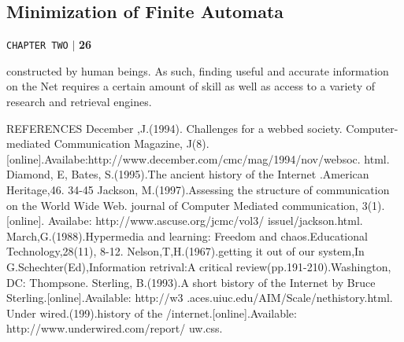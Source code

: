 \documentclass[a4,9pt]{beamer}
\begin{document}
\begin{frame}
\section*{Minimization of Finite Automata}
\begin{flushright}
 \texttt{CHAPTER TWO} \hspace*{0.1cm}\textbf{$|$} \hspace*{0.1cm} \textbf{26}\hspace*{0.1cm}
\end{flushright}
\vspace*{1cm}
constructed by human beings. As such, finding useful and accurate information on the
Net requires a certain amount of skill as well as access to a variety of research and
retrieval engines.

REFERENCES
December ,J.(1994). Challenges for a webbed society. Computer-mediated Communication Magazine,
J(8).[online].Availabe:http://www.december.com/cmc/mag/1994/nov/websoc. html.
Diamond, E, Bates, S.(1995).The ancient history of the Internet .American Heritage,46. 34-45
Jackson, M.(1997).Assessing the structure of communication on the World Wide Web. journal of
Computer Mediated communication, 3(1).[online]. Availabe: http://www.ascuse.org/jcmc/vol3/
issuel/jackson.html.
March,G.(1988).Hypermedia and learning: Freedom and chaos.Educational Technology,28(11),
8-12.
Nelson,T,H.(1967).getting it out of our system,In G.Schechter(Ed),Information retrival:A
critical review(pp.191-210).Washington, DC: Thompsone.
Sterling, B.(1993).A short bistory of the Internet by Bruce Sterling.[online].Available: http://w3
.aces.uiuc.edu/AIM/Scale/nethistory.html.
Under wired.(199).history of the /internet.[online].Available: http://www.underwired.com/report/
uw.css.
\end{frame}
\end{document}
